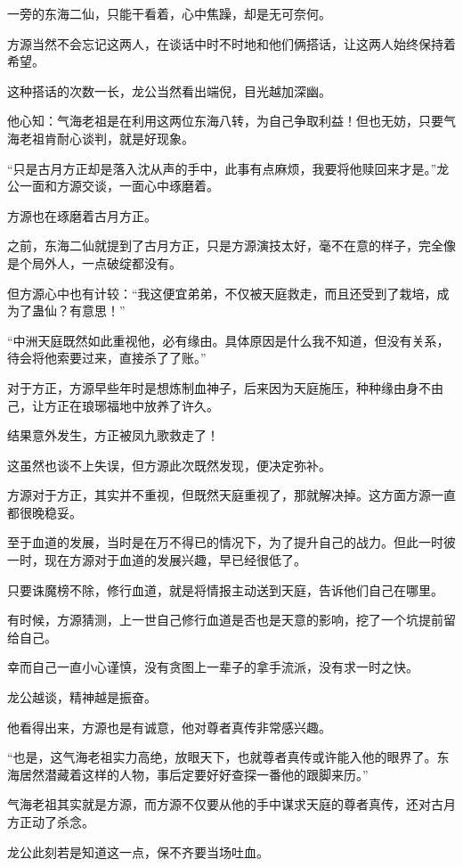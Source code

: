 \begin{this_body}
一旁的东海二仙，只能干看着，心中焦躁，却是无可奈何。

方源当然不会忘记这两人，在谈话中时不时地和他们俩搭话，让这两人始终保持着希望。

这种搭话的次数一长，龙公当然看出端倪，目光越加深幽。

他心知：气海老祖是在利用这两位东海八转，为自己争取利益！但也无妨，只要气海老祖肯耐心谈判，就是好现象。

“只是古月方正却是落入沈从声的手中，此事有点麻烦，我要将他赎回来才是。”龙公一面和方源交谈，一面心中琢磨着。

方源也在琢磨着古月方正。

之前，东海二仙就提到了古月方正，只是方源演技太好，毫不在意的样子，完全像是个局外人，一点破绽都没有。

但方源心中也有计较：“我这便宜弟弟，不仅被天庭救走，而且还受到了栽培，成为了蛊仙？有意思！”

“中洲天庭既然如此重视他，必有缘由。具体原因是什么我不知道，但没有关系，待会将他索要过来，直接杀了了账。”

对于方正，方源早些年时是想炼制血神子，后来因为天庭施压，种种缘由身不由己，让方正在琅琊福地中放养了许久。

结果意外发生，方正被凤九歌救走了！

这虽然也谈不上失误，但方源此次既然发现，便决定弥补。

方源对于方正，其实并不重视，但既然天庭重视了，那就解决掉。这方面方源一直都很晚稳妥。

至于血道的发展，当时是在万不得已的情况下，为了提升自己的战力。但此一时彼一时，现在方源对于血道的发展兴趣，早已经很低了。

只要诛魔榜不除，修行血道，就是将情报主动送到天庭，告诉他们自己在哪里。

有时候，方源猜测，上一世自己修行血道是否也是天意的影响，挖了一个坑提前留给自己。

幸而自己一直小心谨慎，没有贪图上一辈子的拿手流派，没有求一时之快。

龙公越谈，精神越是振奋。

他看得出来，方源也是有诚意，他对尊者真传非常感兴趣。

“也是，这气海老祖实力高绝，放眼天下，也就尊者真传或许能入他的眼界了。东海居然潜藏着这样的人物，事后定要好好查探一番他的跟脚来历。”

气海老祖其实就是方源，而方源不仅要从他的手中谋求天庭的尊者真传，还对古月方正动了杀念。

龙公此刻若是知道这一点，保不齐要当场吐血。


\end{this_body}

